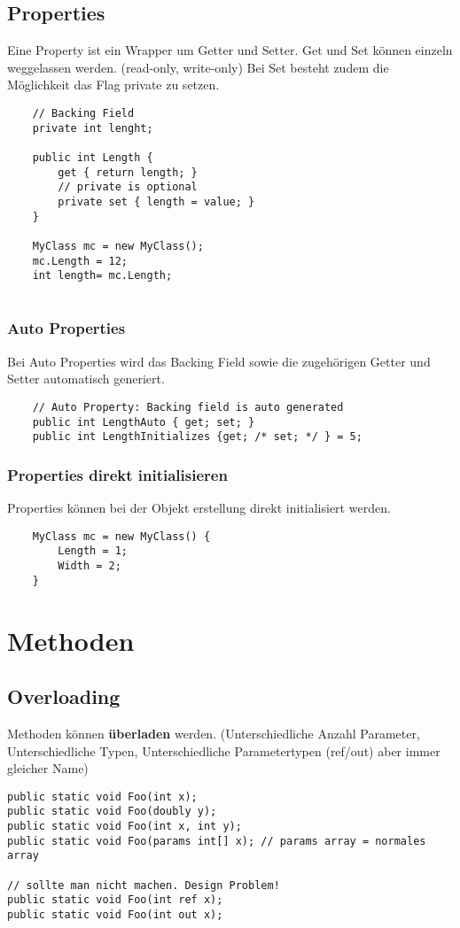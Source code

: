 \subsection{Properties}
Eine Property ist ein Wrapper um Getter und Setter. Get und Set können einzeln weggelassen werden. (read-only, write-only) Bei Set besteht zudem die Möglichkeit das Flag private zu setzen. 
\begin{lstlisting}
	// Backing Field
	private int lenght;
	
	public int Length {
		get { return length; }
		// private is optional
		private set { length = value; } 
	}
	
	MyClass mc = new MyClass();
	mc.Length = 12;
	int length= mc.Length;
	
\end{lstlisting}

\subsubsection{Auto Properties}
Bei Auto Properties wird das Backing Field sowie die zugehörigen Getter und Setter automatisch generiert.
\begin{lstlisting}
	// Auto Property: Backing field is auto generated
	public int LengthAuto { get; set; }
	public int LengthInitializes {get; /* set; */ } = 5;
\end{lstlisting}

\subsubsection{Properties direkt initialisieren}
Properties können bei der Objekt erstellung direkt initialisiert werden. 
\begin{lstlisting}
	MyClass mc = new MyClass() {
		Length = 1;
		Width = 2;
	}
\end{lstlisting}

\section{Methoden}
\subsection{Overloading}
Methoden können \textbf{überladen} werden. (Unterschiedliche Anzahl Parameter, Unterschiedliche Typen, Unterschiedliche Parametertypen (ref/out) aber immer gleicher Name)
\begin{lstlisting}
public static void Foo(int x);
public static void Foo(doubly y);
public static void Foo(int x, int y);
public static void Foo(params int[] x); // params array = normales array

// sollte man nicht machen. Design Problem!
public static void Foo(int ref x);
public static void Foo(int out x);
\end{lstlisting}


